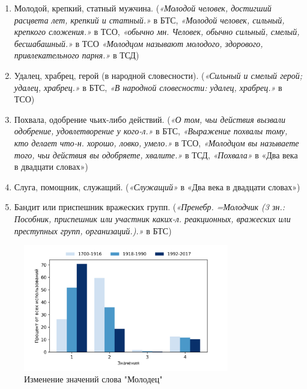 \begin{enumerate}
    \item Молодой, крепкий, статный мужчина.
    (\textit{«Молодой человек, достигший расцвета лет, крепкий и статный.»} в БТС,
    \textit{«Молодой человек, сильный, крепкого сложения.»} в ТСО,  %
    \textit{«обычно мн. Человек, обычно сильный, смелый, бесшабашный.»} в ТСО
    \textit{«Молодцом называют молодого, здорового, привлекательного парня.»} в ТСД)

    \item Удалец, храбрец, герой (в народной словесности).
    (\textit{«Сильный и смелый герой; удалец, храбрец.»} в БТС,
    \textit{«В народной словесности: удалец, храбрец.»} в ТСО)

    \item Похвала, одобрение чьих-либо действий.
    (\textit{«О том, чьи действия вызвали одобрение, удовлетворение у кого-л.»} в БТС,
    \textit{«Выражение похвалы тому, кто делает что-н. хорошо, ловко, умело.»} в ТСО,
    \textit{«Молодцом вы называете того, чьи действия вы одобряете, хвалите.»} в ТСД,
    \textit{«Похвала»} в «Два века в двадцати словах»)

    \item Слуга, помощник, служащий.
(\textit{«Служащий»} в «Два века в двадцати словах»)

    \item Бандит или приспешник вражеских групп.
(\textit{«Пренебр. =Молодчик (3 зн.: Пособник, приспешник или участник каких-л. реакционных,
вражеских или преступных групп, организаций.).»} в БТС)
\end{enumerate}


\begin{figure}[H]
	\centering
	\includegraphics[width=0.8\textwidth]{img/visualizations/molodets_minimal}
	\caption{Изменение значений слова "Молодец"}
	\label{fig:Молодец}
\end{figure}

